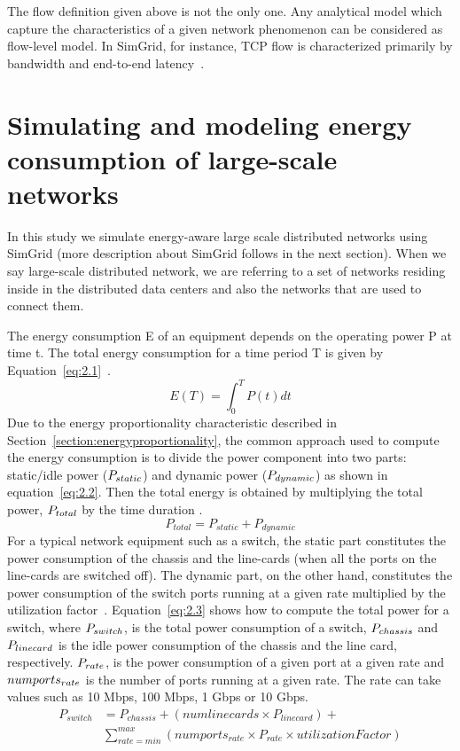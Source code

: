 The flow definition given above is not the only one. Any analytical model which capture the characteristics of a given network phenomenon can be considered as flow-level model. In SimGrid, for instance, TCP flow is characterized primarily by bandwidth and end-to-end latency~\cite{DBLP:journals/jpdc/CasanovaGLQS14}.
\section{Simulating and modeling energy consumption of large-scale networks}

In this study we simulate energy-aware large scale distributed networks using SimGrid (more description about SimGrid follows in the next section). When we say large-scale distributed network, we are referring to a set of networks residing inside in the distributed data centers and also the networks that are used to connect them. 

The energy consumption E of an equipment depends on the operating power P at time t. The total energy consumption for a time period T is given by Equation~\ref{eq:2.1}~\cite{DBLP:conf/wowmom/OrgerieLLL11}. 
\begin{equation} \label{eq:2.1}
  E(T) = \int_{0}^{T} P(t) dt
\end{equation} 
Due to the energy proportionality characteristic described in Section~\ref{section:energyproportionality}, the common approach used to compute the energy consumption is to divide the power component into two parts: static/idle power (\($$P_{static}$$\)) and dynamic power (\($$P_{dynamic}$$\)) as shown in equation~\ref{eq:2.2}. Then the total energy is obtained by multiplying the total power, \($$P_{total}$$\) by the time duration \cite{DBLP:conf/wowmom/OrgerieLLL11,DBLP:journals/tjs/KliazovichBK12,DBLP:conf/networking/MahadevanSBR09,DBLP:journals/comsur/DayarathnaWF16}. 
\begin{equation} \label{eq:2.2}
 P_{total} = P_{static} + P_{dynamic}
\end{equation} 
For a typical network equipment such as a switch, the static part constitutes the power consumption of the chassis and the line-cards (when all the ports on the line-cards are switched off). The dynamic part, on the other hand, constitutes the power consumption of the switch ports running at a given rate multiplied by the utilization factor~\cite{DBLP:conf/networking/MahadevanSBR09}. Equation~\ref{eq:2.3} shows how to compute the total power for a switch, where \($$P_{switch}$$\), is the total power consumption of a switch, \($$P_{chassis}$$\) and \($$P_{linecard}$$\) is the idle power consumption of the chassis and the line card, respectively. \($$P_{rate}$$\), is the power consumption of a given port at a given rate and \($$numports_{rate}$$\) is the number of ports running at a given rate. The rate can take values such as 10 Mbps, 100 Mbps, 1 Gbps or 10 Gbps.
\begin{equation} \label{eq:2.3}
\begin{split}
P_{switch} &= P_{chassis} + (numlinecards \times P_{linecard})  + \\
&\sum_{rate=min}^{max} (numports_{rate} \times P_{rate} \times utilizationFactor)
\end{split}
\end{equation}
